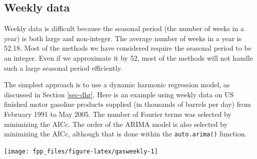 \documentclass[]{book}
\newenvironment{Shaded}{\begin{snugshade}}{\end{snugshade}}
\newcommand{\ControlFlowTok}[1]{\textcolor[rgb]{0.13,0.29,0.53}{\textbf{#1}}}
\newcommand{\DataTypeTok}[1]{\textcolor[rgb]{0.13,0.29,0.53}{#1}}
\newcommand{\DecValTok}[1]{\textcolor[rgb]{0.00,0.00,0.81}{#1}}
\newcommand{\KeywordTok}[1]{\textcolor[rgb]{0.13,0.29,0.53}{\textbf{#1}}}
\newcommand{\NormalTok}[1]{#1}
\newcommand{\OperatorTok}[1]{\textcolor[rgb]{0.81,0.36,0.00}{\textbf{#1}}}
\newcommand{\OtherTok}[1]{\textcolor[rgb]{0.56,0.35,0.01}{#1}}
\newcommand{\StringTok}[1]{\textcolor[rgb]{0.31,0.60,0.02}{#1}}
\begin{document}
\hypertarget{weekly-data}{%
\subsection*{Weekly data}\label{weekly-data}}

Weekly data is difficult because the seasonal period (the number of weeks in a year) is both large and non-integer. The average number of weeks in a year is 52.18. Most of the methods we have considered require the seasonal period to be an integer. Even if we approximate it by 52, most of the methods will not handle such a large seasonal period efficiently.

The simplest approach is to use a dynamic harmonic regression model, as discussed in Section \ref{sec-dhr}. Here is an example using weekly data on US finished motor gasoline products supplied (in thousands of barrels per day) from February 1991 to May 2005. The number of Fourier terms was selected by minimizing the AICc. The order of the ARIMA model is also selected by minimizing the AICc, although that is done within the \texttt{auto.arima()} function.

\begin{Shaded}
\end{Shaded}

\begin{center}\texttt{[image: fpp\_files/figure-latex/gasweekly-1]} \end{center}
\end{document}
